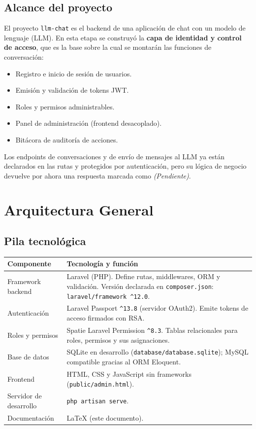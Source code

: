 \subsection{Alcance del proyecto}
El proyecto \texttt{llm-chat} es el backend de una aplicación de chat con un modelo de lenguaje (LLM). En esta etapa se construyó la \textbf{capa de identidad y control de acceso}, que es la base sobre la cual se montarán las funciones de conversación:
\begin{itemize}
    \item Registro e inicio de sesión de usuarios.
    \item Emisión y validación de tokens JWT.
    \item Roles y permisos administrables.
    \item Panel de administración (frontend desacoplado).
    \item Bitácora de auditoría de acciones.
\end{itemize}
Los endpoints de conversaciones y de envío de mensajes al LLM ya están declarados en las rutas y protegidos por autenticación, pero su lógica de negocio devuelve por ahora una respuesta marcada como \emph{(Pendiente)}.

\section{Arquitectura General}

\subsection{Pila tecnológica}
\begin{longtable}{p{4.2cm}p{10.8cm}}
\toprule
\textbf{Componente} & \textbf{Tecnología y función} \\
\midrule
\endhead
Framework backend & Laravel (PHP). Define rutas, middlewares, ORM y validación. Versión declarada en \texttt{composer.json}: \texttt{laravel/framework \^{}12.0}. \\
Autenticación & Laravel Passport \texttt{\^{}13.8} (servidor OAuth2). Emite tokens de acceso firmados con RSA. \\
Roles y permisos & Spatie Laravel Permission \texttt{\^{}8.3}. Tablas relacionales para roles, permisos y sus asignaciones. \\
Base de datos & SQLite en desarrollo (\texttt{database/database.sqlite}); MySQL compatible gracias al ORM Eloquent. \\
Frontend & HTML, CSS y JavaScript sin frameworks (\texttt{public/admin.html}). \\
Servidor de desarrollo & \texttt{php artisan serve}. \\
Documentación & \LaTeX{} (este documento). \\
\bottomrule
\end{longtable}

